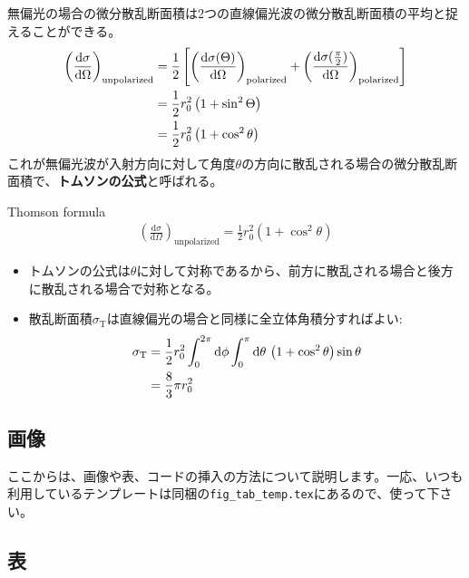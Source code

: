 \documentclass[a4paper,papersize,uplatex,dvipdfmx,10pt]{jsarticle}
\begin{document}
\begin{screen}
  無偏光の場合の微分散乱断面積は2つの直線偏光波の微分散乱断面積の平均と捉えることができる。
  \begin{align}
    \left( \frac{\mathrm{d}\sigma}{\mathrm{d}\Omega} \right)_{\mathrm{unpolarized}} &=
    \frac{1}{2}\left[ \left( \frac{\mathrm{d}\sigma(\Theta)}{\mathrm{d}\Omega} \right)_{\mathrm{polarized}} + \left( \frac{\mathrm{d}\sigma(\frac{\pi}{2})}{\mathrm{d}\Omega} \right)_{\mathrm{polarized}} \right]\notag\\
    &= \frac{1}{2}r_{0}^{2}\left( 1+\sin^{2}\Theta \right)\notag\\
    &= \frac{1}{2}r_{0}^{2}\left( 1+\cos^{2}\theta \right)
  \end{align}
  これが無偏光波が入射方向に対して角度$\theta$の方向に散乱される場合の微分散乱断面積で、\textbf{トムソンの公式}と呼ばれる。
  \begin{itembox}[l]{Thomson formula}
    \begin{align*}
      \left( \frac{\mathrm{d}\sigma}{\mathrm{d}\Omega} \right)_{\mathrm{unpolarized}} = \frac{1}{2}r_{0}^{2}\left( 1+\cos^{2}\theta \right)
    \end{align*}
  \end{itembox}
  \begin{itemize}
    \item トムソンの公式は$\theta$に対して対称であるから、前方に散乱される場合と後方に散乱される場合で対称となる。
    \item 散乱断面積$\sigma_{\mathrm{T}}$は直線偏光の場合と同様に全立体角積分すればよい:
    \begin{align}
      \sigma_{\mathrm{T}} &= \frac{1}{2}r_{0}^{2} \int^{2\pi}_{0}\mathrm{d}\phi \int^{\pi}_{0}\mathrm{d}\theta\, \left( 1+\cos^{2}\theta \right) \sin\theta\notag\\
      &= \frac{8}{3}\pi r_{0}^{2}\label{eq:sanran_unpol}
    \end{align}
  \end{itemize}
\end{screen}

\subsection{画像} %
ここからは、画像や表、コードの挿入の方法について説明します。一応、いつも利用しているテンプレートは同梱の\texttt{fig\_tab\_temp.tex}にあるので、使って下さい。

\subsection{表} %
\end{document}

